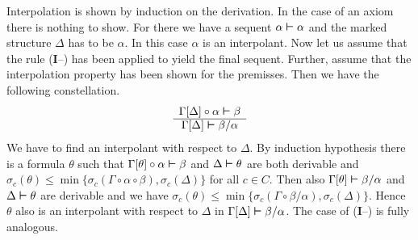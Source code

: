 Interpolation is shown by induction on the derivation. In the case 
of an axiom there is nothing to show.
For there we have a sequent $\alpha \boldsymbol{\vdash} \alpha$ and the marked
structure $\Delta$ has to be $\alpha$. In this case $\alpha$ is
an interpolant. Now let us assume that the rule (\textbf{I}--{\mtt{\tf}}) 
has been applied to yield the final sequent. Further, assume that the
interpolation property has been shown for the premisses.
Then we have the following constellation.
\begin{equation}
\begin{array}{c}
\Gamma[\Delta] \circ \alpha \boldsymbol{\vdash} \beta \\\hline
\Gamma[\Delta] \boldsymbol{\vdash} \beta/\alpha
\end{array}
\end{equation}
We have to find an interpolant with respect to $\Delta$.
By induction hypothesis there is a formula $\theta$ such that
$\Gamma[\theta] \circ \alpha \boldsymbol{\vdash} \beta$ and
$\Delta \boldsymbol{\vdash} \theta$ are both derivable and
$\sigma_c(\theta) \leq \min\{\sigma_c(\Gamma \circ \alpha \circ \beta), %
\sigma_c(\Delta)\}$ for all $c \in C$. Then also 
$\Gamma[\theta] \boldsymbol{\vdash} \beta/\alpha$
and $\Delta \boldsymbol{\vdash} \theta$ are derivable and we have
$\sigma_c(\theta) \leq \min\{\sigma_c(\Gamma \circ
\beta/\alpha), \sigma_c(\Delta)\}$. Hence $\theta$ also is an
interpolant with respect to $\Delta$ in $\Gamma[\Delta] \bvdash %
\beta/\alpha$. The case of (\textbf{I}--{\mtt{\tb}}) is fully
analogous.


